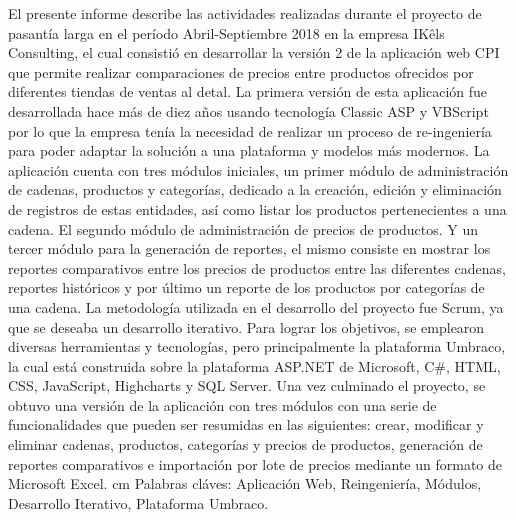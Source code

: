 \documentclass[pregrado]{tesis-usb}
\begin{document}
\frontmatter
\maketitle


\begin{resumen}
    El presente informe describe las actividades realizadas durante el proyecto de pasantía larga en el período Abril-Septiembre 2018 en la empresa IKêls Consulting, el cual consistió en desarrollar la versión 2 de la aplicación web CPI que permite realizar comparaciones de precios entre productos ofrecidos por diferentes tiendas de ventas al detal. La primera versión de esta aplicación fue desarrollada hace más de diez años usando tecnología Classic ASP y VBScript por lo que la empresa tenía la necesidad de realizar un proceso de re-ingeniería para poder adaptar la solución a una plataforma y modelos más modernos. La aplicación cuenta con tres módulos iniciales, un primer módulo de administración de cadenas, productos y categorías, dedicado a la creación, edición y eliminación de registros de estas entidades, así como listar los productos pertenecientes a una cadena. El segundo módulo de administración de precios de productos. Y un tercer módulo para la generación de reportes, el mismo consiste en mostrar los reportes comparativos entre los precios de productos entre las diferentes cadenas, reportes históricos y por último un reporte de los productos por categorías de una cadena. La metodología utilizada en el desarrollo del proyecto fue Scrum, ya que se deseaba un desarrollo iterativo. Para lograr los objetivos, se emplearon diversas herramientas y tecnologías, pero principalmente la plataforma Umbraco, la cual está construida sobre la plataforma ASP.NET de Microsoft, C\#, HTML, CSS, JavaScript, Highcharts y SQL Server. Una vez culminado el proyecto, se obtuvo una versión de la aplicación con tres módulos con una serie de funcionalidades que pueden ser resumidas en las siguientes: crear, modificar y eliminar cadenas, productos, categorías y precios de productos, generación de reportes comparativos e importación por lote de precios mediante un formato de Microsoft Excel.
   cm
    Palabras cl\'aves: Aplicación Web, Reingeniería, Módulos, Desarrollo Iterativo, Plataforma Umbraco.
\end{resumen}
\tableofcontents
\listoffigures
\listoftables
\useacronyms

\mainmatter







\nocite{*}

\end{document}
